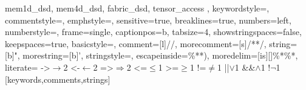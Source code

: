 {{    mem1d_dsd, mem4d_dsd, fabric_dsd, tensor_access
  },
  keywordstyle=\color{keywordlila},
  commentstyle=\color{commentgreen},
  emphstyle=\color{emphblue},
  sensitive=true,
  breaklines=true,
  numbers=left,
  numberstyle=\tiny\color{commentgrey},
  frame=single,
  captionpos=b,
  tabsize=4,
  showstringspaces=false,
  keepspaces=true,
  basicstyle=\footnotesize\ttfamily,
  comment=[l]{//},
  morecomment=[s]{/*}{*/},
  string=[b]",
  morestring=[b]',
  stringstyle=\color{emphblue},
  escapeinside={\%*}{*)},
  moredelim=[is][\color{commentgreen}]{\%*}{\%*},
  literate=
    {->}{{$\rightarrow$}}2
    {<-}{{$\leftarrow$}}2
    {=>}{{$\Rightarrow$}}2
    {<=}{{$\leq$}}1
    {>=}{{$\geq$}}1
    {!=}{{$\neq$}}1
    {||}{{$\lor$}}1
    {&&}{{$\land$}}1
    {!}{{$\neg$}}1
}[keywords,comments,strings]
